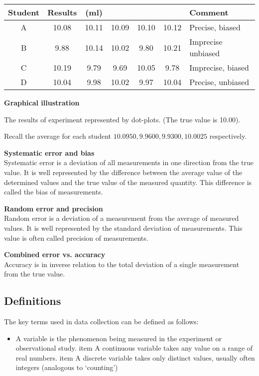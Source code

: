 ﻿\documentclass[]{report}
\begin{document}
\begin{tabular}{|c|ccccc|l|}
\hline
Student & Results  & (ml) &  &  &  &Comment \\ \hline
A & 10.08 & 10.11 &10.09 &10.10&10.12 & Precise, biased\\ \hline
B & 9.88 &10.14& 10.02 &9.80& 10.21& Imprecise unbiased\\ \hline
C & 10.19 &9.79& 9.69 &10.05& 9.78 & Imprecise, biased\\ \hline
D & 10.04 &9.98 &10.02 &9.97 &10.04 & Precise, unbiased \\
\hline
\end{tabular}
\bigskip

\textbf{Graphical illustration}


The results of experiment represented by dot-plots. (The true value is 10.00).


Recall the average for each student $ 10.0950, 9.9600, 9.9300, 10.0025 $ respectively.


\textbf{Systematic error and bias}\\
Systematic error is a deviation of all measurements in one direction from the true value. It is well represented by the difference between the average value of the determined values and the true value
of the measured quantity. This difference is called the bias of measurements.

\textbf{Random error and precision}\\
Random error is a deviation of a measurement from the average of measured values.
It is well represented by the standard deviation of measurements.
This value is often called precision of measurements.

\textbf{Combined error vs. accuracy}\\
Accuracy is in inverse relation to the total deviation of a single measurement from the true value.


\subsection*{Definitions}
The key terms used in data collection can be deﬁned as follows:
\begin{itemize}
\item A variable is the phenomenon being measured in the experiment or observational
study.
item A continuous variable takes any value on a range of real numbers.
item A discrete variable takes only distinct values, usually often integers (analogous to
‘counting’)
\end{itemize}
\end{document}
